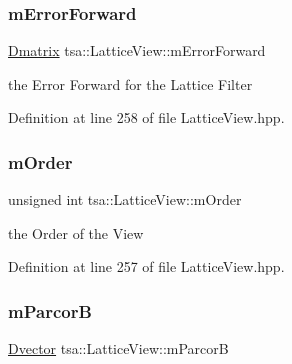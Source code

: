 \mbox{\label{classtsa_1_1_lattice_view_ac7976d0ac256453229dec51c14da0c26}} 
\subsubsection{\texorpdfstring{m\+Error\+Forward}{mErrorForward}}
{\footnotesize\ttfamily \hyperlink{namespacetsa_ad260cd21c1891c4ed391fe788569aba4}{Dmatrix} tsa\+::\+Lattice\+View\+::m\+Error\+Forward\hspace{0.3cm}{\ttfamily [private]}}



the Error Forward for the Lattice Filter 



Definition at line 258 of file Lattice\+View.\+hpp.

\mbox{\label{classtsa_1_1_lattice_view_acb69a220044c95ee2b32d90ce4ee2f7c}} 
\subsubsection{\texorpdfstring{m\+Order}{mOrder}}
{\footnotesize\ttfamily unsigned int tsa\+::\+Lattice\+View\+::m\+Order\hspace{0.3cm}{\ttfamily [private]}}



the Order of the View 



Definition at line 257 of file Lattice\+View.\+hpp.

\mbox{\label{classtsa_1_1_lattice_view_a07aba04a75f98622d97ef4baac7a95e6}} 
\subsubsection{\texorpdfstring{m\+ParcorB}{mParcorB}}
{\footnotesize\ttfamily \hyperlink{namespacetsa_a8900fb03d849baf447a1a0efe2561fb2}{Dvector} tsa\+::\+Lattice\+View\+::m\+ParcorB\hspace{0.3cm}{\ttfamily [private]}}



